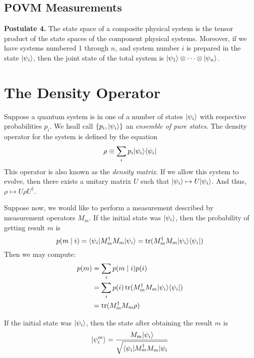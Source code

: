 \subsection*{POVM Measurements}

\begin{mdframed}
    \textbf{Postulate 4.} The state space of a composite physical system is the tensor product of the state spaces of the component physical systems. Moreover, if we have systems numbered 1 through $n$, and system number $i$ is prepared in the state $|\psi_i\rangle$, then the joint state of the total system is $|\psi_1\rangle\otimes\cdots\otimes|\psi_n\rangle$.
\end{mdframed}

\section{The Density Operator}
Suppose a quantum system is in one of a number of states $|\psi_i\rangle$ with respective probabilities $p_i$. We hsall call $\{p_i,|\psi_i\rangle\}$ an \textit{ensemble of pure states}. The density operator for the system is defined by the equation
\begin{equation*}
    \rho \equiv \sum_i p_i|\psi_i\rangle\langle\psi_i|
\end{equation*}
This operator is also known as the \textit{density matrix}. If we allow this system to evolve, then there exists a unitary matrix $U$ such that $|\psi_i\rangle\mapsto U|\psi_i\rangle$. And thus, $\rho\mapsto U\rho U^\dagger$.

Suppose now, we would like to perform a measurement described by measurement operators $M_m$. If the initial state was $|\psi_i\rangle$, then the probability of getting result $m$ is 
\begin{equation*}
    p(m\mid i) = \langle\psi_i|M_m^\dagger M_m|\psi_i\rangle = \operatorname{tr}(M_m^\dagger M_m|\psi_i\rangle\langle\psi_i|)
\end{equation*}
Then we may compute:
\begin{align*}
    p(m) &= \sum_i p(m\mid i)p(i)\\
    &= \sum_i p(i)\operatorname{tr}(M_m^\dagger M_m|\psi_i\rangle\langle\psi_i|)\\
    &= \operatorname{tr}(M_m^\dagger M_m\rho)
\end{align*}

If the initial state was $|\psi_i\rangle$, then the state after obtaining the result $m$ is 
\begin{equation*}
    |\psi_i^m\rangle = \frac{M_m|\psi_i\rangle}{\sqrt{\langle\psi_i|M_m^\dagger M_m|\psi_i}}
\end{equation*}

